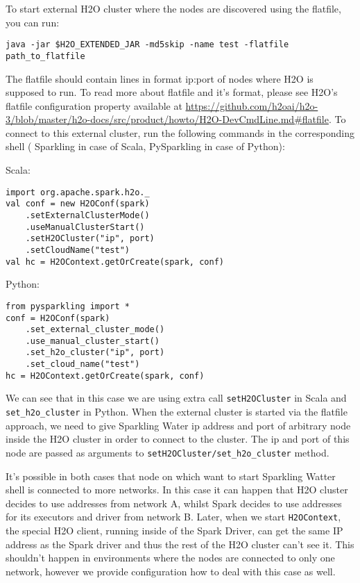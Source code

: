 To start external H2O cluster where the nodes are discovered using the flatfile, you can run:

\begin{lstlisting}[style=bash]
java -jar $H2O_EXTENDED_JAR -md5skip -name test -flatfile path_to_flatfile
\end{lstlisting}

The flatfile should contain lines in format ip:port of nodes where H2O is supposed to run. To read more about flatfile and it's format, please see H2O's flatfile configuration property available at \url{https://github.com/h2oai/h2o-3/blob/master/h2o-docs/src/product/howto/H2O-DevCmdLine.md#flatfile}.
To connect to this external cluster, run the following commands in the corresponding shell ( Sparkling in case of Scala, PySparkling in case of Python):

Scala:
\begin{lstlisting}[style=Scala]
import org.apache.spark.h2o._
val conf = new H2OConf(spark)
    .setExternalClusterMode()
    .useManualClusterStart()
    .setH2OCluster("ip", port)
    .setCloudName("test")
val hc = H2OContext.getOrCreate(spark, conf)
\end{lstlisting}

Python:
\begin{lstlisting}[style=Python]
from pysparkling import *
conf = H2OConf(spark)
    .set_external_cluster_mode()
    .use_manual_cluster_start()
    .set_h2o_cluster("ip", port)
    .set_cloud_name("test")
hc = H2OContext.getOrCreate(spark, conf)
\end{lstlisting}

We can see that in this case we are using extra call \texttt{setH2OCluster} in Scala and \texttt{set\_h2o\_cluster} in Python. When the external cluster is started via the flatfile approach, we need to give Sparkling Water ip address and port of arbitrary node inside the H2O cluster in order to connect to the cluster. The ip and port of this node are passed as arguments to \texttt{setH2OCluster/set\_h2o\_cluster} method.

It's possible in both cases that node on which want to start Sparkling Watter shell is connected to more networks. In this case it can happen that H2O cluster decides to use addresses from network A, whilst Spark decides to use addresses for its executors and driver from network B. Later, when we start \texttt{H2OContext}, the special H2O client, running inside of the Spark Driver, can get the same IP address as the Spark driver and thus the rest of the H2O cluster can't see it. This shouldn't happen in environments where the nodes are connected to only one network, however we provide configuration how to deal with this case as well.

